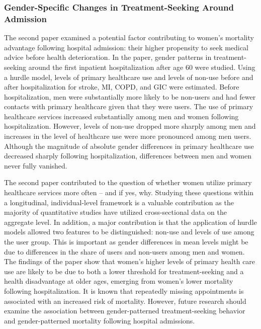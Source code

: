 
\subsubsection*{Gender-Specific Changes in Treatment-Seeking Around Admission}

The second paper examined a potential factor contributing to women's 
mortality advantage following hospital admission: their higher propensity 
to seek medical advice before health deterioration.\citep{o2005s,juel2008men,
oksuzyan2008,banks2013men} In the paper, gender patterns in treatment-seeking 
around the first inpatient hospitalization after age 60 were studied. 
Using a hurdle model, levels of primary healthcare use and levels of 
non-use before and after hospitalization for stroke, MI, COPD, and 
GIC were estimated. Before hospitalization, 
men were substantially more likely to be non-users and had fewer 
contacts with primary healthcare given that they were users. The 
use of primary healthcare services increased substantially among 
men and women following hospitalization. However, levels of non-use 
dropped more sharply among men and increases in the level of healthcare 
use were more pronounced among men users. Although the magnitude 
of absolute gender differences in primary healthcare use decreased 
sharply following hospitalization, differences between men and women 
never fully vanished.

The second paper contributed to the question of whether women utilize 
primary healthcare services more often -- and if yes, why.\citep{case2005sex,
juel2008men,hunt2011women,wang2013men,wang2014gender} Studying these questions 
within a longitudinal, individual-level framework is a valuable 
contribution as the majority of quantitative studies have utilized 
cross-sectional data on the aggregate level.\citep{juel2008men,banks2013men,
wang2013men} In addition, a major contribution is that the application of 
hurdle models allowed two features to be distinguished: non-use and levels 
of use among the user group. This is important as gender differences in 
mean levels might be due to differences in the share of users and non-users 
among men and women. The findings of the paper show that women's higher 
levels of primary health care use are likely to be due to both a lower 
threshold for treatment-seeking and a health disadvantage at older ages, 
emerging from women's lower mortality following hospitalization. It is 
known that repeatedly missing appointments is associated with an increased 
risk of mortality.\citep{McQueenie2019} However, future research should 
examine the association between gender-patterned treatment-seeking behavior 
and gender-patterned mortality following hospital admissions.\\

